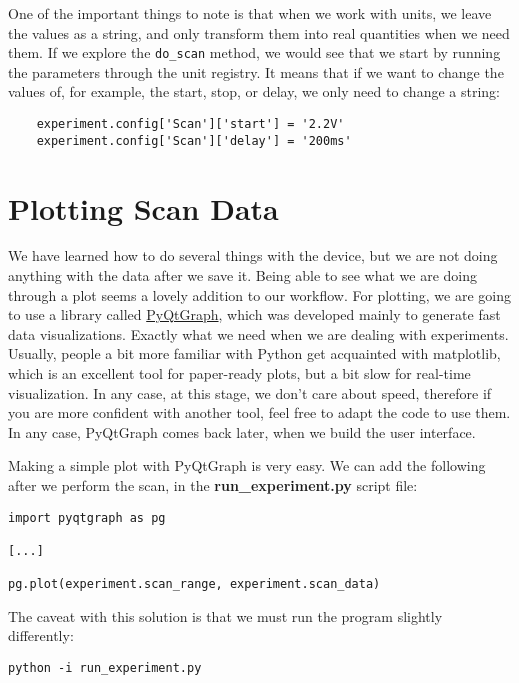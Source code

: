 One of the important things to note is that when we work with units, we leave the values as a string, and only transform them into real quantities when we need them. If we explore the \texttt{do\_scan} method, we would see that we start by running the parameters through the unit registry. It means that if we want to change the values of, for example, the start, stop, or delay, we only need to change a string:

\begin{verbatim}
    experiment.config['Scan']['start'] = '2.2V'
    experiment.config['Scan']['delay'] = '200ms'
\end{verbatim}

\section{Plotting Scan Data}\label{sec:basic-plotting}
We have learned how to do several things with the device, but we are not doing anything with the data after we save it. Being able to see what we are doing through a plot seems a lovely addition to our workflow. For plotting, we are going to use a library called \href{http://www.pyqtgraph.org/}{PyQtGraph}, which was developed mainly to generate fast data visualizations. Exactly what we need when we are dealing with experiments. Usually, people a bit more familiar with Python get acquainted with matplotlib, which is an excellent tool for paper-ready plots, but a bit slow for real-time visualization. In any case, at this stage, we don't care about speed, therefore if you are more confident with another tool, feel free to adapt the code to use them. In any case, PyQtGraph comes back later, when we build the user interface.

Making a simple plot with PyQtGraph is very easy. We can add the following after we perform the scan, in the \textbf{run\_experiment.py} script file:

\begin{verbatim}
import pyqtgraph as pg

[...]

pg.plot(experiment.scan_range, experiment.scan_data)
\end{verbatim}

The caveat with this solution is that we must run the program slightly differently:

\begin{verbatim}
python -i run_experiment.py
\end{verbatim}

